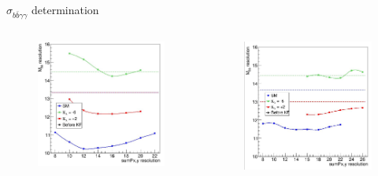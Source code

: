 \begin{frame}{$\sigma_{b \bar{b} \gamma \gamma}$ determination}
\begin{columns}
\begin{figure}
    \centering
    \includegraphics[width=1.\textwidth]{BackUp/Part7/Img/0JetScan.png}
\end{figure}
\begin{figure}
    \centering
    \includegraphics[width=1.\textwidth]{BackUp/Part7/Img/1JetScan.png}
\end{figure}
\end{columns}
\end{frame}

